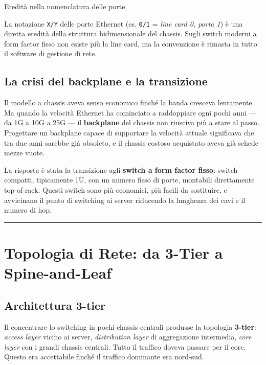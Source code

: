 \documentclass[
  italian,
  openany]{book}
\begin{document}
\begin{calloutnote}{Eredità nella nomenclatura delle porte}

La notazione \texttt{X/Y} delle porte Ethernet (es. \texttt{0/1} =
\emph{line card 0, porta 1}) è una diretta eredità della struttura
bidimensionale del chassis. Sugli switch moderni a form factor fisso non
esiste più la line card, ma la convenzione è rimasta in tutto il
software di gestione di rete.

\end{calloutnote}

\subsection{La crisi del backplane e la
transizione}\label{la-crisi-del-backplane-e-la-transizione}

Il modello a chassis aveva senso economico finché la banda cresceva
lentamente. Ma quando la velocità Ethernet ha cominciato a raddoppiare
ogni pochi anni --- da 1G a 10G a 25G --- il \textbf{backplane} del
chassis non riusciva più a stare al passo. Progettare un backplane
capace di supportare la velocità attuale significava che tra due anni
sarebbe già obsoleto, e il chassis costoso acquistato aveva già schede
mezze vuote.

La risposta è stata la transizione agli \textbf{switch a form factor
fisso}: switch compatti, tipicamente 1U, con un numero fisso di porte,
montabili direttamente top-of-rack. Questi switch sono più economici,
più facili da sostituire, e avvicinano il punto di switching ai server
riducendo la lunghezza dei cavi e il numero di hop.

\begin{center}\rule{0.5\linewidth}{0.5pt}\end{center}

\section{Topologia di Rete: da 3-Tier a
Spine-and-Leaf}\label{topologia-di-rete-da-3-tier-a-spine-and-leaf}

\subsection{Architettura 3-tier}\label{architettura-3-tier}

Il concentrare lo switching in pochi chassis centrali produsse la
topologia \textbf{3-tier}: \emph{access layer} vicino ai server,
\emph{distribution layer} di aggregazione intermedia, \emph{core layer}
con i grandi chassis centrali. Tutto il traffico doveva passare per il
core. Questo era accettabile finché il traffico dominante era nord-sud.
\end{document}
